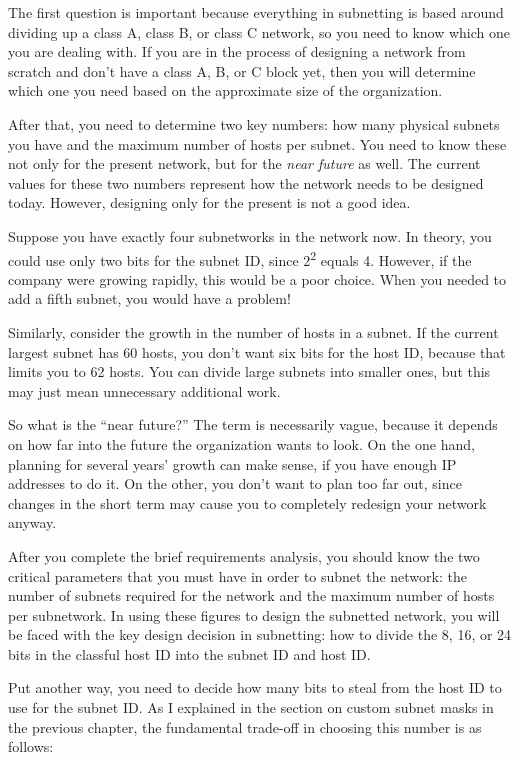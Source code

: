 The first question is important because everything in subnetting is
based around dividing up a class A, class B, or class C network, so you
need to know which one you are dealing with. If you are in the process
of designing a network from scratch and don't have a class A, B, or C
block yet, then you will determine which one you need based on the
approximate size of the organization.

After that, you need to determine two key numbers: how many physical
subnets you have and the maximum number of hosts per subnet. You need to
know these not only for the present network, but for the {\emph{near
future}} as well. The current values for these two numbers represent how
the network needs to be designed today. However, designing only for the
present is not a good idea.

Suppose you have exactly four subnetworks in the network now. In theory,
you could use only two bits for the subnet ID, since
2\textsuperscript{2} equals 4. However, if the company were growing
rapidly, this would be a poor choice. When you needed to add a fifth
subnet, you would have a problem!

Similarly, consider the growth in the number of hosts in a subnet. If
the current largest subnet has 60 hosts, you don't want six bits for the
host ID, because that limits you to 62 hosts. You can divide large
subnets into smaller ones, but this may just mean unnecessary additional
work.

So what is the ``near future?''
The term is necessarily vague, because it depends on how far into the future the organization wants to look.
On the one hand, planning for several years' growth can make sense, if you
have enough IP addresses to do it. On the other, you don't want to plan
too far out, since changes in the short term may cause you to completely
redesign your network anyway.

After you complete the brief requirements analysis, you should know the
two critical parameters that you must have in order to subnet the
network: the number of subnets required for the network and the maximum
number of hosts per subnetwork. In using these figures to design the
subnetted network, you will be faced with the key design decision in
subnetting: how to divide the 8, 16, or 24 bits in the classful host ID
into the subnet ID and host ID.

Put another way, you need to decide how many bits to steal from the host
ID to use for the subnet ID. As I explained in the section on custom
subnet masks in the previous chapter, the fundamental trade-off in
choosing this number is as follows:

